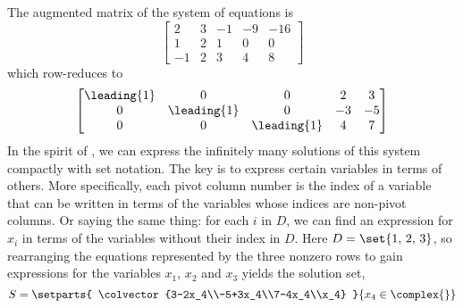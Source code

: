 The augmented matrix of the system of equations is
%
\begin{equation*}
\begin{bmatrix}
 2 & 3 & -1 & -9 & -16 \\
 1 & 2 & 1 & 0 & 0 \\
 -1 & 2 & 3 & 4 & 8
\end{bmatrix}
\end{equation*}
%
which row-reduces to
%
\begin{equation*}
\begin{bmatrix}
 \leading{1} & 0 & 0 & 2 & 3 \\
 0 & \leading{1} & 0 & -3 & -5 \\
 0 & 0 & \leading{1} & 4 & 7
\end{bmatrix}
\end{equation*}
%
In the spirit of , we can express the infinitely many solutions of this system compactly with set notation.  The key is to express certain variables in terms of others.  More specifically, each pivot column number is the index of a variable that can be written in terms of the variables whose indices are non-pivot columns.  Or saying the same thing: for each $i$ in $D$, we can find an expression for $x_i$ in terms of the variables without their index in $D$.  Here $D=\set{1,\,2,\,3}$, so rearranging the equations represented by the three nonzero rows to gain expressions for the variables $x_1$, $x_2$ and $x_3$ yields the solution set,
%
\begin{equation*}
S=\setparts{
\colvector{3-2x_4\\-5+3x_4\\7-4x_4\\x_4}
}{
x_4\in\complex{\null}
}
\end{equation*}
